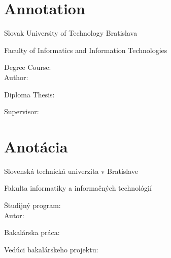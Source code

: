 
\thispagestyle{empty}

\section*{Annotation}

\begin{minipage}[t]{1\columnwidth}%
Slovak University of Technology Bratislava 

Faculty of Informatics and Information Technologies

Degree Course: \myStudyProgram\\

Author: \myName

Diploma Thesis: \myTitle

Supervisor: \mySupervisor

\myDate%
\end{minipage}

\bigskip{}

\lipsum[3]


\newpage{}\thispagestyle{empty}

\newpage
\thispagestyle{empty}
\mbox{}
\newpage

\thispagestyle{empty}
\section*{Anotácia}

\begin{minipage}[t]{1\columnwidth}%
Slovenská technická univerzita v Bratislave

Fakulta informatiky a informačných technológií

Študijný program: \myStudyProgram\\

Autor: \myName

Bakalárska práca: \myTitle

Vedúci bakalárskeho projektu: \mySupervisor

\myDate%
\end{minipage}

\bigskip{}

\lipsum[3]


\newpage{}\thispagestyle{empty}\medskip{}









\newpage

